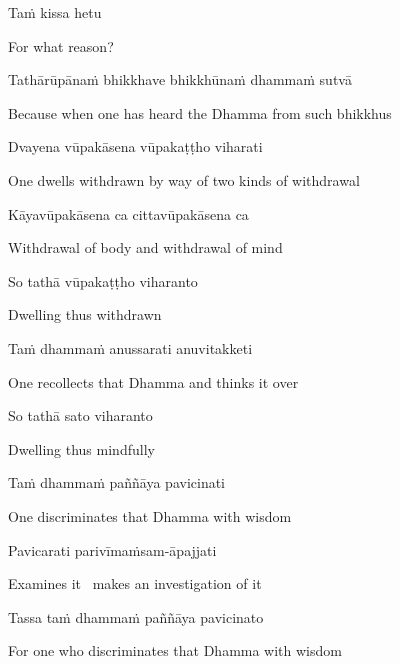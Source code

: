 Taṁ kissa hetu

\begin{cprenglish}
  For what reason?
\end{cprenglish}

Tathārūpānaṁ bhikkhave bhikkhūnaṁ dhammaṁ sutvā

\begin{cprenglish}
  Because when one has heard the Dhamma from such bhikkhus
\end{cprenglish}

Dvayena vūpakāsena vūpakaṭṭho viharati

\begin{cprenglish}
  One dwells withdrawn by way of two kinds of withdrawal
\end{cprenglish}

Kāyavūpakāsena ca cittavūpakāsena ca

\begin{cprenglish}
  Withdrawal of body and withdrawal of mind
\end{cprenglish}

So tathā vūpakaṭṭho viharanto

\begin{cprenglish}
  Dwelling thus withdrawn
\end{cprenglish}

Taṁ dhammaṁ anussarati anuvitakketi

\begin{cprenglish}
  One recollects that Dhamma and thinks it over
\end{cprenglish}

So tathā sato viharanto

\begin{cprenglish}
  Dwelling thus mindfully
\end{cprenglish}

Taṁ dhammaṁ paññāya pavicinati

\begin{cprenglish}
  One discriminates that Dhamma with wisdom
\end{cprenglish}

Pavicarati parivīmaṁsam-āpajjati

\begin{cprenglish}
  Examines it \breathmark\ makes an investigation of it
\end{cprenglish}

Tassa taṁ dhammaṁ paññāya pavicinato

\begin{cprenglish}
  For one who discriminates that Dhamma with wisdom
\end{cprenglish}

